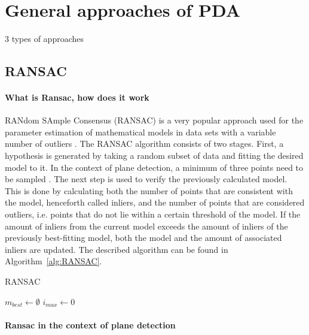 \documentclass[main.tex]{subfiles}
\begin{document}
\section{General approaches of PDA}
3 types of approaches \cite{Hulik_Spanel_Smrz_Materna_2014,Limberger_Oliveira_2015}


\subsection*{RANSAC}
\paragraph{What is Ransac, how does it work}
RANdom SAmple Consensus (RANSAC)\cite{Fischler1981RandomSC} is a very popular approach used for the parameter estimation of mathematical models in data sets with a variable number of outliers \cite{Yang_Forstner,Sun_Mordohai_2019,Oehler_Stueckler_Welle_Schulz_Behnke_2011}.
The RANSAC algorithm consists of two stages. First, a hypothesis is generated by taking a random subset of data and fitting the desired model to it. In the context of plane detection, a minimum of three points need to be sampled \cite{Yang_Forstner}. The next step is used to verify the previously calculated model. This is done by calculating both the number of points that are consistent with the model, henceforth called inliers, and the number of points that are considered outliers, i.e. points that do not lie within a certain threshold of the model. If the amount of inliers from the current model exceeds the amount of inliers of the previously best-fitting model, both the model and the amount of associated inliers are updated.
The described algorithm can be found in Algorithm~\ref{alg:RANSAC}.

\begin{algorithm}
\caption{RANSAC}\label{alg:RANSAC}
$m_{best} \gets \emptyset$\;
$i_{max} \gets 0$\;
\end{algorithm}

\paragraph{Ransac in the context of plane detection}
\end{document}

